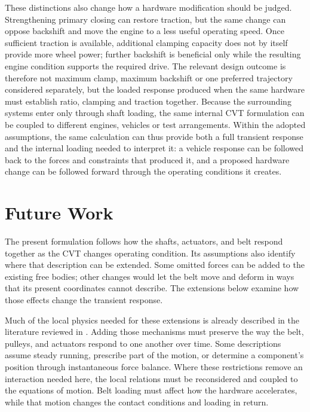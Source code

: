 \documentclass[11pt]{report}
\numberwithin{equation}{section}
\newcounter{assump}
\begin{document}
These distinctions also change how a hardware modification should be judged. Strengthening
primary closing can restore traction, but the same change can oppose backshift and move the
engine to a less useful operating speed. Once sufficient traction is available, additional clamping
capacity does not by itself provide more wheel power; further backshift is beneficial only while
the resulting engine condition supports the required drive. The relevant design outcome is
therefore not maximum clamp, maximum backshift or one preferred trajectory considered
separately, but the loaded response produced when the same hardware must establish ratio,
clamping and traction together. Because the surrounding systems enter only through shaft loading, 
the same internal CVT formulation can be coupled to different engines, vehicles or test arrangements. 
Within the adopted assumptions, the same calculation can thus
provide both a full transient response and the internal loading needed to interpret it: a vehicle
response can be followed back to the forces and constraints that produced it, and a proposed
hardware change can be followed forward through the operating conditions it creates.

\section{Future Work}
\label{sec:future_work}

The present formulation follows how the shafts, actuators, and belt respond
together as the CVT changes operating condition. Its assumptions also identify
where that description can be extended. Some omitted forces can be added to
the existing free bodies; other changes would let the belt move and deform in
ways that its present coordinates cannot describe. The extensions below
examine how those effects change the transient response.

Much of the local physics needed for these extensions is already described in
the literature reviewed in . Adding those
mechanisms must preserve the way the belt, pulleys, and actuators respond to
one another over time. Some descriptions assume steady running, prescribe part
of the motion, or determine a component's position through instantaneous force
balance. Where these restrictions remove an interaction needed here, the local
relations must be reconsidered and coupled to the equations of motion. Belt
loading must affect how the hardware accelerates, while that motion changes
the contact conditions and loading in return.
\end{document}
